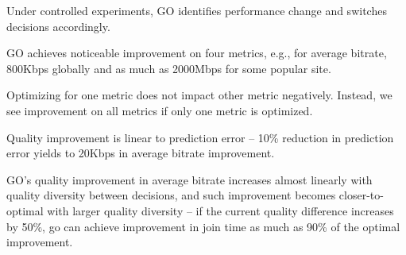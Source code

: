 \begin{packedenumerate}
	\item Under controlled experiments, GO identifies performance change and switches decisions accordingly.
	\item GO achieves noticeable improvement on four metrics, e.g., for  average bitrate, 800Kbps globally and as much as 2000Mbps for some popular site.
	\item Optimizing for one metric does not impact other metric negatively. Instead, we see improvement on all metrics if only one metric is optimized.
	\item Quality improvement is linear to prediction error -- 10\% reduction in prediction error yields to 20Kbps in average bitrate improvement.
	\item GO's quality improvement in average bitrate increases almost linearly with quality diversity between decisions, and such improvement becomes closer-to-optimal with larger quality diversity -- if the current quality difference increases by 50\%, go can achieve improvement in join time as much as 90\% of the optimal improvement.
\end{packedenumerate}


